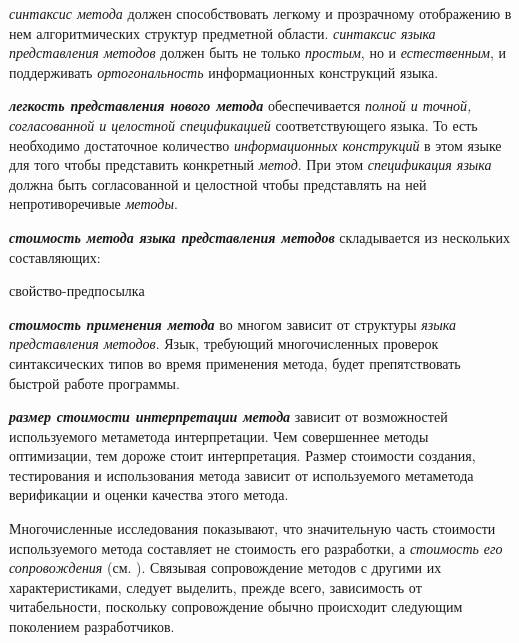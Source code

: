 \textit{синтаксис метода} должен способствовать легкому и прозрачному отображению в нем алгоритмических структур предметной области. \textit{синтаксис языка представления методов} должен быть не только \textit{простым}, но и \textit{естественным}, и поддерживать \textit{ортогональность} информационных конструкций языка.

\textbf{\textit{легкость представления нового метода}} обеспечивается \textit{полной и точной, согласованной и целостной спецификацией} соответствующего языка. То есть необходимо достаточное количество \textit{информационных конструкций} в этом языке для того чтобы представить конкретный \textit{метод}. При этом \textit{спецификация языка} должна быть согласованной и целостной чтобы представлять на ней непротиворечивые \textit{методы}.

\textbf{\textit{стоимость метода языка представления методов}} складывается из нескольких составляющих:

\begin{SCn}
\begin{scnrelfromlist}{свойство-предпосылка}
\end{scnrelfromlist}
\end{SCn}

\textbf{\textit{стоимость применения метода}} во многом зависит от структуры \textit{языка представления методов}. Язык, требующий многочисленных проверок синтаксических типов во время применения метода, будет препятствовать быстрой работе программы.

\textbf{\textit{размер стоимости интерпретации метода}} зависит от возможностей используемого метаметода интерпретации. Чем совершеннее методы оптимизации, тем дороже стоит интерпретация.
Размер стоимости создания, тестирования и использования метода зависит от используемого метаметода верификации и оценки качества этого метода.

Многочисленные исследования показывают, что значительную часть стоимости используемого метода составляет не стоимость его разработки, а \textit{стоимость его сопровождения} (см. ). Связывая сопровождение методов с другими их характеристиками, следует выделить, прежде всего, зависимость от читабельности, поскольку сопровождение обычно происходит следующим поколением разработчиков.

